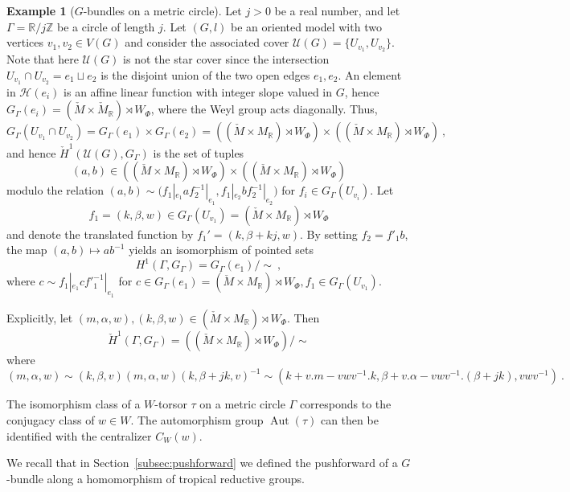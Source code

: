 \documentclass[10pt, a4paper]{amsart}
\theoremstyle{definition}
\newtheorem{example}[theorem]{Example}
\theoremstyle{myitemstyle}
\newcommand{\R}{\mathbb{R}}
\newcommand{\Z}{\mathbb{Z}}
\newcommand{\Mcheck}{{\check{M}}}
\newcommand{\calH}{\mathcal{H}}
\newcommand{\calU}{\mathcal{U}}
\DeclareMathOperator{\Aut}{Aut}
\newcommand{\Ga}{\Gamma}
\begin{document}
 




\begin{example} 
[$G$-bundles on a metric circle] 
\label{ex:explicit description of torsors on circle}
Let $j >0$ be a real number, and let $\Gamma = \R / j\Z$ be a circle of length $j$. Let $(G,l)$  be an oriented model with two vertices $v_1,v_2 \in V(G)$ and consider the associated cover $\calU(G) = \{U_{v_1}, U_{v_2}\}$. Note that here $\calU(G)$ is not the star cover since the intersection $U_{v_1} \cap U_{v_2} = e_1 \sqcup e_2$ is the disjoint union of the two open edges $e_1,e_2$. An element in $\calH(e_i)$ is an affine linear function with integer slope valued in $G$, hence $G_\Gamma(e_i) =  (\Mcheck \times \Mcheck_\R) \rtimes W_\Phi$, where the Weyl group acts diagonally. Thus,
    \[
    G_{\Gamma}(U_{v_1} \cap U_{v_2}) = G_{\Gamma}(e_1) \times G_{\Gamma}(e_2) = ((\Mcheck \times M_\R) \rtimes W_\Phi) \times ((\Mcheck \times M_\R) \rtimes W_\Phi) \ ,
    \]
    and hence $\check H^1(\calU(G),G_{\Ga})$ is the set of tuples
    \[
    (a,b) \in ((\Mcheck \times M_\R) \rtimes W_\Phi) \times ((\Mcheck \times M_\R) \rtimes W_\Phi)
    \]
    modulo the relation $(a,b) \sim \big(f_1|_{e_1}af_2^{-1}|_{e_1}, f_1|_{e_2}bf_2^{-1}|_{e_2}\big)$ for $f_i \in G_{\Gamma}(U_{v_i})$. Let
    \[f_1 = (k,\beta,w) \in G_{\Gamma}(U_{v_1}) = (\Mcheck \times M_\R) \rtimes W_\Phi
    \]
    and denote the translated function by $f_1' = (k,\beta + kj,w)$. By setting $f_2 = f'_1 b$, the map $(a,b) \mapsto ab^{-1}$ yields an isomorphism of pointed sets
    \[
    H^1(\Gamma,G_{\Gamma}) = G_{\Gamma}(e_1) / \sim \ ,
    \]
    where $c \sim f_1|_{e_1}cf'^{-1}_1|_{e_1}$ for $c \in G_{\Gamma}(e_1) =(\Mcheck \times M_\R) \rtimes W_\Phi, f_1 \in G_{\Gamma}(U_{v_1})$.
    
    Explicitly, let $(m,\alpha,w), (k,\beta,w) \in  (\Mcheck \times M_\R) \rtimes W_\Phi$. Then 
    \[
    \check H^1(\Gamma,G_{\Gamma}) = ((\Mcheck \times M_\R) \rtimes W_\Phi) / \sim 
    \]
    where
    \[
    (m,\alpha,w) \sim (k,\beta,v)(m,\alpha,w)(k,\beta+jk,v)^{-1}\sim (k+v.m-vwv^{-1}.k, \beta+v.\alpha-vwv^{-1}.(\beta+jk),vwv^{-1}) \ .
    \]

The isomorphism class of a $W$-torsor $\tau$ on a metric circle $\Gamma$ corresponds to the conjugacy class of $w\in W$. The automorphism group $\Aut(\tau)$ can then be identified with the centralizer $C_W(w)$. 


\end{example}


We recall that in Section~\ref{subsec:pushforward} we defined the  pushforward of a $G$-bundle along a homomorphism of tropical reductive groups. 
\end{document}
